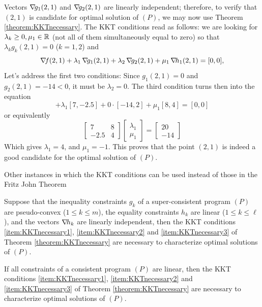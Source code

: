 \begin{example}
Vectors $\mathop{\nabla\! {g_1}}(2,1)$ and $\mathop{\nabla\! {g_2}}(2,1)$ are linearly independent; therefore, to verify that $(2,1)$ is candidate for optimal solution of $(P)$, we may now use Theorem \ref{theorem:KKTnecessary}.  The KKT conditions read as follows: we are looking for $\lambda_k \geq 0, \mu_1 \in \mathbb{R}$ (not all of them simultaneously equal to zero) so that $\lambda_k g_k(2,1)=0$ ($k=1,2$) and
\begin{equation*}
\mathop{\nabla\! {f}}(2,1) + \lambda_1 \mathop{\nabla\! {g_1}}(2,1) + \lambda_2 \mathop{\nabla\! {g_2}}(2,1) + \mu_1 \mathop{\nabla\! {h_1}}(2,1) = [0,0], 
\end{equation*}
Let's address the first two conditions: Since $g_1(2,1)=0$ and $g_2(2,1)=-14<0$, it must be $\lambda_2=0$.  The third condition turns then into the equation
\begin{equation*}
[-20,14] + \lambda_1 [7,-2.5] + 0 \cdot [-14,2] + \mu_1 [8,4] = [0,0]
\end{equation*}
or equivalently
\begin{equation*}
\begin{bmatrix} 7 & 8 \\ -2.5 & 4 \end{bmatrix} \begin{bmatrix} \lambda_1 \\ \mu_1 \end{bmatrix} = \begin{bmatrix} 20 \\ -14 \end{bmatrix}
\end{equation*}
Which gives $\lambda_1=4$, and $\mu_1=-1$.  This proves that the point $(2,1)$ is indeed a good candidate for the optimal solution of $(P)$.
\end{example}

\separator

Other instances in which the KKT conditions can be used instead of those in the Fritz John Theorem

\begin{theorem}\label{theorem:Slater}
Suppose that the inequality constraints $g_k$ of a super-consistent program $(P)$ are pseudo-convex ($1\leq k \leq m$), the equality constraints $h_k$ are linear ($1\leq k \leq \ell$), and the vectors $\mathop{\nabla\! {h_k}}$ are linearly independent, then the KKT conditions \ref{item:KKTnecessary1}, \ref{item:KKTnecessary2} and \ref{item:KKTnecessary3} of Theorem \ref{theorem:KKTnecessary} are necessary to characterize optimal solutions of $(P)$.
\end{theorem}

\begin{theorem}
If all constraints of a consistent program $(P)$ are linear, then the KKT conditions \ref{item:KKTnecessary1}, \ref{item:KKTnecessary2} and \ref{item:KKTnecessary3} of Theorem \ref{theorem:KKTnecessary} are necessary to characterize optimal solutions of $(P)$.
\end{theorem}